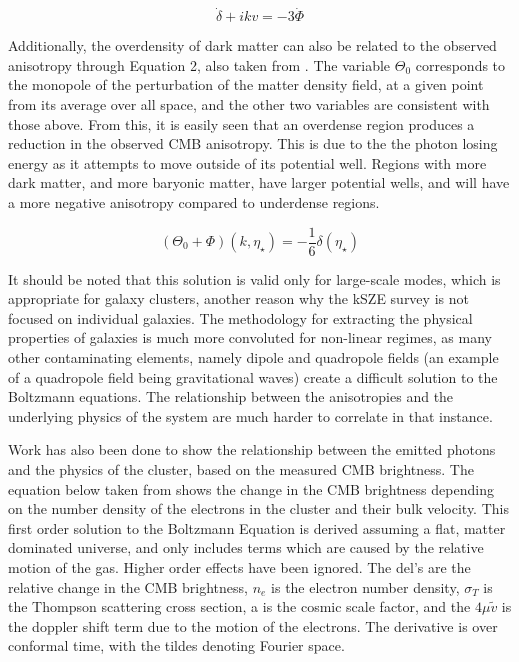 \documentclass[manuscript]{aastex}
\begin{document}
\begin{equation}
\dot{\delta} + ikv = -3\dot{\Phi}
\end{equation}

Additionally, the overdensity of dark matter can also be related to the observed anisotropy  through Equation 2, also taken from \cite{Dodelson2003}. The variable \(\Theta_{0}\) corresponds to the monopole of the perturbation of the matter density field, at a given point from its average over all space, and the other two variables are consistent with those above. From this, it is easily seen that an overdense region produces a reduction in the observed CMB anisotropy. This is due to the the photon losing energy as it attempts to move outside of its potential well. Regions with more dark matter, and more baryonic matter, have larger potential wells, and will have a more negative anisotropy compared to underdense regions. 

\begin{equation}
(\Theta_{0} + \Phi)(k,\eta_{\star}) = -\frac{1}{6} \delta(\eta_{\star})
\end{equation}

It should be noted that this solution is valid only for large-scale modes, which is appropriate for galaxy clusters, another reason why the kSZE survey is not focused on individual galaxies. The methodology for extracting the physical properties of galaxies is much more convoluted  for non-linear regimes, as many other contaminating elements, namely dipole and quadropole fields (an example of a quadropole field being gravitational waves) create a difficult solution to the Boltzmann equations. The relationship between the anisotropies and the underlying physics of the system are much harder to correlate in that instance. 

Work has also been done to show the relationship between the emitted photons and the physics of the cluster, based on the measured CMB brightness. The equation below taken from \cite{Dodelson1995} shows the change in the CMB brightness depending on the number density of the electrons in the cluster and their bulk velocity. This first order solution to the Boltzmann Equation is derived assuming a flat, matter dominated universe, and only includes terms which are caused by the relative motion of the gas. Higher order effects have been ignored. The del's are the relative change in the CMB brightness, $n_{e}$ is the electron number density, $\sigma_{T}$ is the Thompson scattering cross section, a is the cosmic scale factor, and the $4 \mu \tilde v$ is the doppler shift term due to the motion of the electrons. The derivative is over conformal time, with the tildes denoting Fourier space. 
\end{document}
